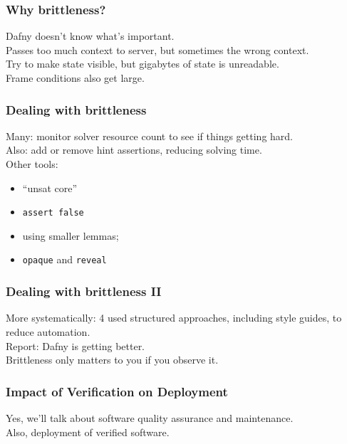 \documentclass{beamer}
\newenvironment{changemargin}[1]{%
  \begin{list}{}{%
    \setlength{\topsep}{0pt}%
    \setlength{\leftmargin}{#1}%
    \setlength{\rightmargin}{1em}
    \setlength{\listparindent}{\parindent}%
    \setlength{\itemindent}{\parindent}%
    \setlength{\parsep}{\parskip}%
  }%
  \item[]}{\end{list}}
\begin{document}
\begin{frame}
  \frametitle{Why brittleness?}
  \Large
  \begin{changemargin}{1cm}
    Dafny doesn't know what's important.\\
    Passes too much context to server, but sometimes the wrong context.\\[1em]
    Try to make state visible, but gigabytes of state is unreadable.\\[1em]
    Frame conditions also get large.
  \end{changemargin}
\end{frame}

\begin{frame}
  \frametitle{Dealing with brittleness}
  \Large
  \begin{changemargin}{1cm}
    Many: monitor solver resource count to see if things getting hard.\\[1em]
    Also: add or remove hint assertions, reducing solving time.\\[1em]
    Other tools:
    \begin{itemize}
    \item ``unsat core''
    \item \texttt{assert false}
    \item using smaller lemmas;
    \item \texttt{opaque} and \texttt{reveal}
    \end{itemize}
  \end{changemargin}
\end{frame}

\begin{frame}
  \frametitle{Dealing with brittleness II}
  \Large
  \begin{changemargin}{1cm}
    More systematically: 4 used structured approaches, including style guides, to reduce automation.\\[1em]
    Report: Dafny is getting better.\\[2em]
    Brittleness only matters to you if you observe it.
  \end{changemargin}
\end{frame}

\begin{frame}
  \frametitle{Impact of Verification on Deployment}
  \Large
  \begin{changemargin}{1cm}
    Yes, we'll talk about software quality assurance and maintenance.\\[1em]
    Also, deployment of verified software.
  \end{changemargin}
\end{frame}
\end{document}
